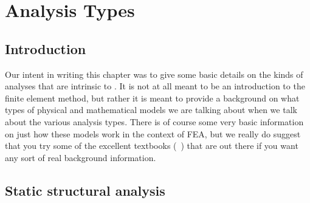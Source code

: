 
\newpage{\pagestyle{empty}\cleardoublepage}

\chapter{\felt{} Analysis Types}
\label{analysis}

\def\trans#1{#1^{\rm T}}

\section{Introduction}

Our intent in writing this chapter was to give some basic details on the
kinds of analyses that are intrinsic to \felt{}.  It is not at all meant to
be an introduction to the finite element method, but rather it is meant
to provide a background on what types of physical and mathematical models
we are talking about when we talk about the various analysis types.
There is of course some very basic information on just how these models
work in the context of FEA, but we really do suggest that you try 
some of the excellent textbooks (~\cite{hughes:fem, zienk:taylor:fem,
logan:fem, burnett:fea, segerlind:fea})
that are out there if you want any sort of real background information.

\section{Static structural analysis}

